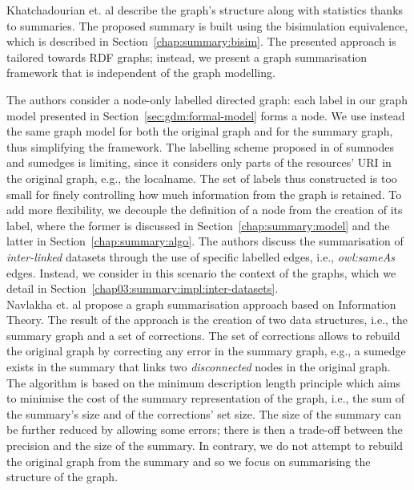 Khatchadourian et. al \cite{khatchadourian:2010:eswc} describe the graph's structure along with statistics thanks to summaries. The proposed summary is built using the bisimulation equivalence, which is described in Section~\ref{chap:summary:bisim}. The presented approach is tailored towards RDF graphs; instead, we present a graph summarisation framework that is independent of the graph modelling.

The authors consider a node-only labelled directed graph: each label in our graph model presented in Section~\ref{sec:gdm:formal-model} forms a node. We use instead the same graph model for both the original graph and for the summary graph, thus simplifying the framework.
The labelling scheme proposed in \cite{khatchadourian:2010:eswc} of sumnodes and sumedges is limiting, since it considers only parts of the resources' URI in the original graph, e.g., the localname. The set of labels thus constructed is too small for finely controlling how much information from the graph is retained. To add more flexibility, we decouple the definition of a node from the creation of its label, where the former is discussed in Section~\ref{chap:summary:model} and the latter in Section~\ref{chap:summary:algo}.
The authors discuss the summarisation of \emph{inter-linked} datasets through the use of specific labelled edges, i.e., \emph{owl:sameAs} edges. Instead, we consider in this scenario the context of the graphs, which we detail in Section~\ref{chap03:summary:impl:inter-datasets}.\\

Navlakha et. al \cite{navlakha:2008:gsb} propose a graph summarisation approach based on Information Theory. The result of the approach is the creation of two data structures, i.e., the summary graph and a set of corrections. The set of corrections allows to rebuild the original graph by correcting any error in the summary graph, e.g., a sumedge exists in the summary that links two \emph{disconnected} nodes in the original graph. The algorithm is based on the minimum description length \cite{grunwald:2007:mdl} principle which aims to minimise the cost of the summary representation of the graph, i.e., the sum of the summary's size and of the corrections' set size.
The size of the summary can be further reduced by allowing some errors; there is then a trade-off between the precision and the size of the summary. In contrary, we do not attempt to rebuild the original graph from the summary and so we focus on summarising the structure of the graph.\\

